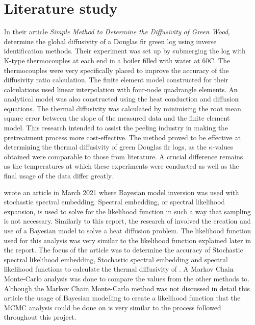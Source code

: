 \section{Literature study}\label{litstudy}
	
	In their article \textit{Simple Method to Determine the Diffusivity of Green Wood}, \citet{bioresource:2020}  determine the global diffusivity of a Douglas fir green log using inverse identification methods. 
	Their experiment was set up by submerging the log with K-type thermocouples at each end in a boiler filled with water at 60\textdegree C. 
	The thermocouples were very specifically placed to improve the accuracy of the diffusivity ratio calculation.
	The finite element model constructed for their calculations used linear interpolation with four-node quadrangle elements.
	An analytical model was also constructed using the heat conduction and diffusion equations.
	The thermal diffusivity was calculated by minimising the root mean square error between the slope of the measured data and the finite element model.
	This research intended to assist the peeling industry in making the pretreatment process more cost-effective.
	The method proved to be effective at determining the thermal diffusivity of green Douglas fir logs, as the $\kappa$-values obtained were comparable to those from literature.
	A crucial difference remains as the temperatures at which these experiments were conducted as well as the final usage of the data differ greatly.


\citeauthor{Wagner:2021} wrote an article in March 2021 where Bayesian model inversion was used with stochastic spectral embedding.
Spectral embedding, or spectral likelihood expansion, is used to solve for the likelihood function in such a way that sampling is not necessary.
Similarly to this report, the research of \citet{Wagner:2021} involved the creation and use of a Bayesian model to solve a heat diffusion problem.
The likelihood function used for this analysis was very similar to the likelihood function explained later in the report.
The focus of the article was to determine the accuracy of Stochastic spectral likelihood embedding, Stochastic spectral embedding and spectral likelihood functions to calculate the thermal diffusivity of .
A Markov Chain Monte-Carlo analysis was done to compare the values from the other methods to.
Although the Markov Chain Monte-Carlo method was not discussed in detail this article the usage of Bayesian modelling to create a likelihood function that the MCMC analysis could be done on is very similar to the process followed throughout this project.


